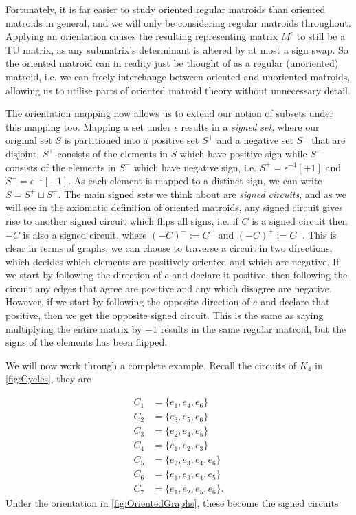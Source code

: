 \documentclass[12pt]{report}
\theoremstyle{definition}
\theoremstyle{upright}
\begin{document}
Fortunately, it is far easier to study oriented regular matroids than oriented matroids in general, and we will only be considering regular matroids throughout.
Applying an orientation causes the resulting representing matrix $M^\epsilon$ to still be a TU matrix, as any submatrix's determinant is altered by at most a sign swap.
So the oriented matroid can in reality just be thought of as a regular (unoriented) matroid, i.e. we can freely interchange between oriented and unoriented matroids, allowing us to utilise parts of oriented matroid theory without unnecessary detail.

The orientation mapping now allows us to extend our notion of subsets under this mapping too.
Mapping a set under $\epsilon$ results in a \textit{signed set}, where our original set $S$ is partitioned into a positive set $S^+$ and a negative set $S^-$ that are disjoint.
$S^+$ consists of the elements in $S$ which have positive sign while $S^-$ consists of the elements in $S^-$ which have negative sign, i.e. $S^+=\epsilon^{-1}[+1]$ and $S^-=\epsilon^{-1}[-1]$.
As each element is mapped to a distinct sign, we can write $S=S^+\sqcup S^-$.
The main signed sets we think about are \textit{signed circuits}, and as we will see in the axiomatic definition of oriented matroids, any signed circuit gives rise to another signed circuit which flips all signs, i.e. if $C$ is a signed circuit then $-C$ is also a signed circuit, where $(-C)^-:=C^+$ and $(-C)^+:=C^-$.
This is clear in terms of graphs, we can choose to traverse a circuit in two directions, which decides which elements are positively oriented and which are negative.
If we start by following the direction of $e$ and declare it positive, then following the circuit any edges that agree are positive and any which disagree are negative.
However, if we start by following the opposite direction of $e$ and declare that positive, then we get the opposite signed circuit.
This is the same as saying multiplying the entire matrix by $-1$ results in the same regular matroid, but the signs of the elements has been flipped.

We will now work through a complete example.
Recall the circuits of $K_4$ in \cref{fig:Cycles}, they are

\[\begin{aligned}
    C_1&=\{e_1, e_4, e_6\}\\
    C_2&=\{e_3, e_5, e_6\}\\
    C_3&=\{e_2, e_4, e_5\}\\
    C_4&=\{e_1, e_2, e_3\}\\
    C_5&=\{e_2, e_3, e_4, e_6\}\\
    C_6&=\{e_1, e_3, e_4, e_5\}\\
    C_7&=\{e_1, e_2, e_5, e_6\}.
\end{aligned}\]
Under the orientation in \cref{fig:OrientedGraphs}, these become the signed circuits
\end{document}
